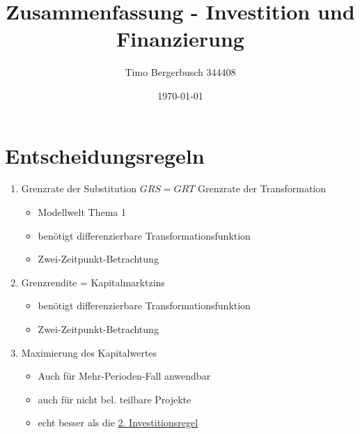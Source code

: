 \documentclass[12pt]{article}
\begin{document}
	
	\title{Zusammenfassung - Investition und Finanzierung}
	\author{Timo Bergerbusch 344408}
	\date{\specialdate\today}
	\maketitle
	\section{Entscheidungsregeln}
	\begin{enumerate}
		\item Grenzrate der Substitution $GRS=GRT$ Grenzrate der Transformation
			\begin{itemize}
				\item Modellwelt Thema 1
				\item benötigt differenzierbare Transformationsfunktion
				\item Zwei-Zeitpunkt-Betrachtung
			\end{itemize}
		\item Grenzrendite = Kapitalmarktzins\label{2Investitionsregel}
			\begin{itemize}
				\item benötigt differenzierbare Transformationsfunktion
				\item Zwei-Zeitpunkt-Betrachtung
			\end{itemize}
		\item Maximierung des Kapitalwertes 
			\begin{itemize}
				\item Auch für Mehr-Perioden-Fall anwendbar
				\item auch für nicht bel. teilbare Projekte
				\item echt besser als die \hyperref[2Investitionsregel]{2. Investitionsregel}
			\end{itemize}
	\end{enumerate}
	
\end{document}
